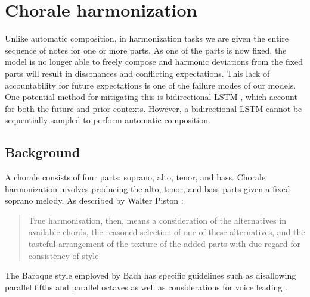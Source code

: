 \chapter{Chorale harmonization}

\ifpdf
    \graphicspath{{Chapter6/Figs/Raster/}{Chapter6/Figs/PDF/}{Chapter6/Figs/}}
\else
    \graphicspath{{Chapter6/Figs/Vector/}{Chapter6/Figs/}}
\fi


Unlike automatic composition, in harmonization tasks we are given the entire sequence of notes
for one or more parts. As one of the parts is now fixed, the model is no longer able to freely
compose and harmonic deviations from the fixed parts will result in dissonances and conflicting
expectations. This lack of accountability for future expectations is one of the failure modes of our models.
One potential method for mitigating this is bidirectional LSTM \citep{Graves2005}, which account
for both the future and prior contexts. However, a bidirectional LSTM cannot be sequentially
sampled to perform automatic composition.

\section{Background}

A chorale consists of four parts: soprano, alto, tenor, and bass. Chorale harmonization
involves producing the alto, tenor, and bass parts given a fixed soprano melody. As described
by Walter Piston \citep{piston1978harmony}:

\begin{quote}
  True harmonisation, then, means a consideration of the alternatives in available chords, the reasoned selection of one
  of these alternatives, and the tasteful arrangement of the texture of the added parts with due regard
  for consistency of style
\end{quote}

The Baroque style employed by Bach has specific guidelines
such as disallowing parallel fifths and parallel octaves as well as
considerations for voice leading \citep{piston1978harmony}.

